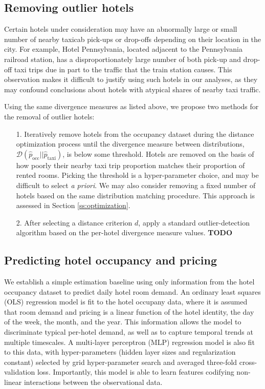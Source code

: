 \documentclass[useAMS, usenatbib]{biom}
\begin{document}
\subsection{Removing outlier hotels}

Certain hotels under consideration may have an abnormally large or small number of nearby taxicab pick-ups or drop-offs depending on their location in the city. For example, Hotel Pennsylvania, located adjacent to the Pennsylvania railroad station, has a disproportionately large number of both pick-up and drop-off taxi trips due in part to the traffic that the train station causes. This observation makes it difficult to justify using such hotels in our analyses, as they may confound conclusions about hotels with atypical shares of nearby taxi traffic.

Using the same divergence measures as listed above, we propose two methods for the removal of outlier hotels:

\begin{itemize}

\item [1.] Iteratively remove hotels from the occupancy dataset during the distance optimization process until the divergence measure between distributions, $\mathcal{D} (\hat{p}_{\mathrm{occ}} || \hat{p}_{\mathrm{taxi}})$, is below some threshold. Hotels are removed on the basis of how poorly their nearby taxi trip proportion matches their proportion of rented rooms. Picking the threshold is a hyper-parameter choice, and may be difficult to select \textit{a priori}. We may also consider removing a fixed number of hotels based on the same distribution matching procedure. This approach is assessed in Section \ref{ss:optimization}.

\item [2.] After selecting a distance criterion $d$, apply a standard outlier-detection algorithm based on the per-hotel divergence measure values. \textbf{TODO}

\end{itemize}

\subsection{Predicting hotel occupancy and pricing}

We establish a simple estimation baseline using only information from the hotel occupancy dataset to predict daily hotel room demand. An ordinary least squares (OLS) regression model is fit to the hotel occupany data, where it is assumed that room demand and pricing is a linear function of the hotel identity, the day of the week, the month, and the year. This information allows the model to discriminate typical per-hotel demand, as well as to capture temporal trends at multiple timescales. A multi-layer perceptron (MLP) regression model is also fit to this data, with hyper-parameters (hidden layer sizes and regularization constant) selected by grid hyper-parameter search and averaged three-fold cross-validation loss. Importantly, this model is able to learn features codifying non-linear interactions between the observational data.
\end{document}
